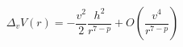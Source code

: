 \begin{equation}
\Delta_v V(r) = - \frac{v^2}{2} \frac{h^2}{r^{7-p}} +
O(\frac{v^4}{r^{7-p}})
\end{equation}

